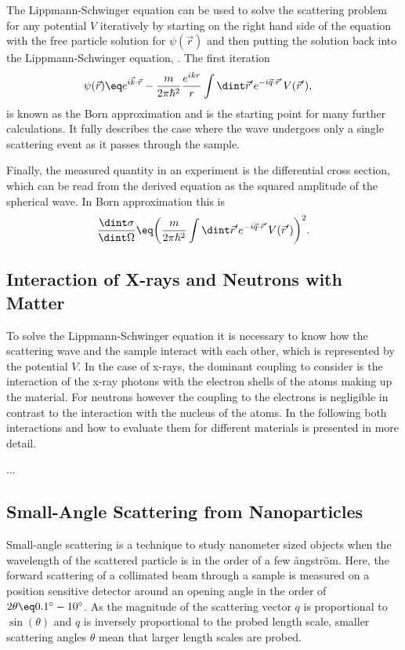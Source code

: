 \documentclass[\main/dresen_thesis.tex]{subfiles}
\begin{document}
The Lippmann-Schwinger equation can be used to solve the scattering problem for any potential $V$ iteratively by starting on the right hand side of the equation with the free particle solution for $\psi (\vec{r})$ and then putting the solution back into the Lippmann-Schwinger equation, \etc.
The first iteration 
\begin{align}
  \psi (\vec{r}) &\eq e^{i\vec{k} \cdot \vec{r}} - \frac{m}{2 \pi\hbar^2} \frac{e^{ikr}}{r} \int \dint \vec{r}^\prime e^{-i\vec{q} \cdot \vec{r}^\prime} V (\vec{r}^\prime),\label{eq:theoreticalBackground:scattering:scatteringTheory:firstBornApproximation}
\end{align}
is known as the Born approximation and is the starting point for many further calculations. It fully describes the case where the wave undergoes only a single scattering event as it passes through the sample. 

Finally, the measured quantity in an experiment is the differential cross section, which can be read from the derived equation as the squared amplitude of the spherical wave. In Born approximation this is
\begin{align}
  \frac{\dint \sigma}{\dint \Omega} \eq \bigg( \frac{m}{2 \pi\hbar^2} \int \dint \vec{r}^\prime e^{-i\vec{q} \cdot \vec{r}^\prime} V (\vec{r}^\prime) \bigg)^2.
\end{align}

\subsection{Interaction of X-rays and Neutrons with Matter}\label{sec:theoreticalBackground:scattering:interactionWithMatter}
To solve the Lippmann-Schwinger equation it is necessary to know how the scattering wave and the sample interact with each other, which is represented by the potential $V$. In the case of x-rays, the dominant coupling to consider is the interaction of the x-ray photons with the electron shells of the atoms making up the material. For neutrons however the coupling to the electrons is negligible in contrast to the interaction with the nucleus of the atoms. In the following both interactions and how to evaluate them for different materials is presented in more detail.

...
\subsection{Small-Angle Scattering from Nanoparticles}\label{sec:theoreticalBackground:scattering:SASNanoparticles}
Small-angle scattering is a technique to study nanometer sized objects when the wavelength of the scattered particle is in the order of a few {\aa}ngstr\"om. 
Here, the forward scattering of a collimated beam through a sample is measured on a position sensitive detector around an opening angle in the order of $2 \theta \eq 0.1^\circ - 10^\circ$. 
As the magnitude of the scattering vector $q$ is proportional to $\sin(\theta)$ and $q$ is inversely proportional to the probed length scale, smaller scattering angles $\theta$ mean that larger length scales are probed. 
\end{document}
